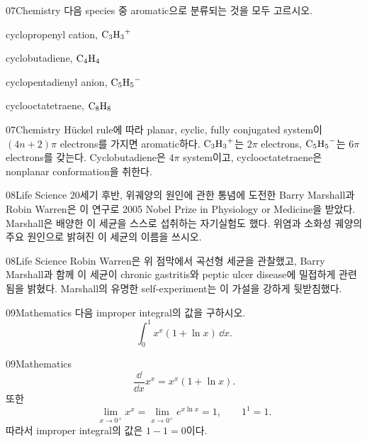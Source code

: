 \documentclass[12pt,aspectratio=169]{beamer}
\begin{document}
\begin{problemframe}{07}{Chemistry}
다음 species 중 aromatic으로 분류되는 것을 모두 고르시오.
\begin{simchoices}
\item cyclopropenyl cation, $\ce{C3H3+}$
\item cyclobutadiene, $\ce{C4H4}$
\item cyclopentadienyl anion, $\ce{C5H5-}$
\item cyclooctatetraene, $\ce{C8H8}$
\end{simchoices}
\end{problemframe}

\begin{solutionframe}{07}{Chemistry}
Hückel rule에 따라 planar, cyclic, fully conjugated system이 $(4n+2)\pi$ electrons를 가지면 aromatic하다. $\ce{C3H3+}$는 $2\pi$ electrons, $\ce{C5H5-}$는 $6\pi$ electrons를 갖는다. Cyclobutadiene은 $4\pi$ system이고, cyclooctatetraene은 nonplanar conformation을 취한다.
\end{solutionframe}

\begin{problemframe}{08}{Life Science}
20세기 후반, 위궤양의 원인에 관한 통념에 도전한 Barry Marshall과 Robin Warren은 이 연구로 2005 Nobel Prize in Physiology or Medicine을 받았다. Marshall은 배양한 이 세균을 스스로 섭취하는 자기실험도 했다. 위염과 소화성 궤양의 주요 원인으로 밝혀진 이 세균의 이름을 쓰시오.
\end{problemframe}

\begin{solutionframe}{08}{Life Science}
Robin Warren은 위 점막에서 곡선형 세균을 관찰했고, Barry Marshall과 함께 이 세균이 chronic gastritis와 peptic ulcer disease에 밀접하게 관련됨을 밝혔다. Marshall의 유명한 self-experiment는 이 가설을 강하게 뒷받침했다.
\end{solutionframe}

\begin{problemframe}{09}{Mathematics}
다음 improper integral의 값을 구하시오.
\[
\int_0^1 x^x(1+\ln x)\,\dd x.
\]
\end{problemframe}

\begin{solutionframe}{09}{Mathematics}
\[
\frac{\dd}{\dd x}x^x=x^x(1+\ln x).
\]
또한
\[
\lim_{x\to0^+}x^x
=\lim_{x\to0^+}e^{x\ln x}=1,
\qquad
1^1=1.
\]
따라서 improper integral의 값은 $1-1=0$이다.
\end{solutionframe}
\end{document}
